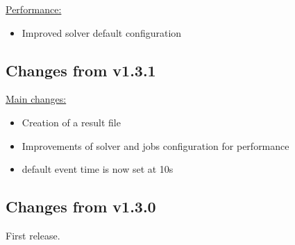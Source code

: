 \documentclass[a4paper, 12pt]{report}
\begin{document}
\underline{Performance:}
\begin{itemize}
\item Improved solver default configuration
\end{itemize}

\subsection{Changes from v1.3.1}

\underline{Main changes:}
\begin{itemize}
\item Creation of a result file
\item Improvements of solver and jobs configuration for performance
\item default event time is now set at 10s
\end{itemize}


\subsection{Changes from v1.3.0}
First release.
\end{document}
